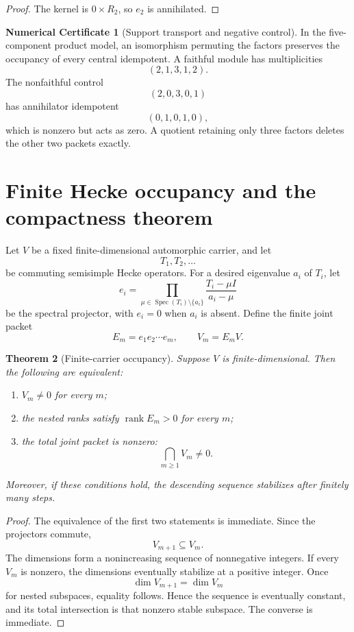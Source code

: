 \documentclass[11pt]{article}
\newtheorem{theorem}{Theorem}[section]
\theoremstyle{definition}
\newtheorem{numericalcertificate}[theorem]{Numerical Certificate}
\theoremstyle{remark}
\newcommand{\Spec}{\operatorname{Spec}}
\newcommand{\rank}{\operatorname{rank}}
\begin{document}
\begin{proof}
The kernel is $0\times R_2$, so $e_2$ is annihilated.
\end{proof}

\begin{numericalcertificate}[Support transport and negative control]
In the five-component product model, an isomorphism permuting the factors preserves the occupancy of every central idempotent.  A faithful module has multiplicities
\[
(2,1,3,1,2).
\]
The nonfaithful control
\[
(2,0,3,0,1)
\]
has annihilator idempotent
\[
(0,1,0,1,0),
\]
which is nonzero but acts as zero.  A quotient retaining only three factors deletes the other two packets exactly.
\end{numericalcertificate}

\section{Finite Hecke occupancy and the compactness theorem}

Let $V$ be a fixed finite-dimensional automorphic carrier, and let
\[
T_1,T_2,\ldots
\]
be commuting semisimple Hecke operators.  For a desired eigenvalue $a_i$ of $T_i$, let
\[
e_i
=
\prod_{\mu\in\Spec(T_i)\setminus\{a_i\}}
\frac{T_i-\mu I}{a_i-\mu}
\]
be the spectral projector, with $e_i=0$ when $a_i$ is absent.  Define the finite joint packet
\[
E_m=e_1e_2\cdots e_m,
\qquad
V_m=E_mV.
\]

\begin{theorem}[Finite-carrier occupancy]
Suppose $V$ is finite-dimensional.  Then the following are equivalent:

\begin{enumerate}
\item $V_m\neq0$ for every $m$;
\item the nested ranks satisfy $\rank E_m>0$ for every $m$;
\item the total joint packet is nonzero:
\[
\bigcap_{m\ge1}V_m\neq0.
\]
\end{enumerate}

Moreover, if these conditions hold, the descending sequence stabilizes after finitely many steps.
\end{theorem}

\begin{proof}
The equivalence of the first two statements is immediate.  Since the projectors commute,
\[
V_{m+1}\subseteq V_m.
\]
The dimensions form a nonincreasing sequence of nonnegative integers.  If every $V_m$ is nonzero, the dimensions eventually stabilize at a positive integer.  Once
\[
\dim V_{m+1}=\dim V_m
\]
for nested subspaces, equality follows.  Hence the sequence is eventually constant, and its total intersection is that nonzero stable subspace.  The converse is immediate.
\end{proof}
\end{document}
